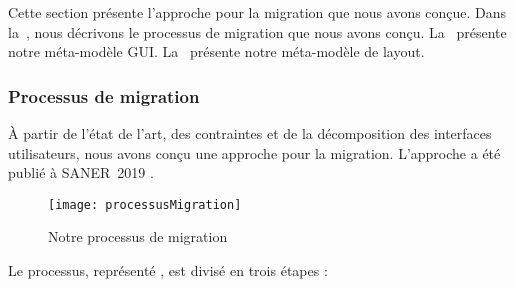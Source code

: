 \documentclass[a4paper]{article}
\begin{document}
Cette section présente l'approche pour la migration que nous avons conçue.
Dans la~, nous décrivons le processus de migration que nous avons conçu. 
La~ présente notre méta-modèle GUI.
La~ présente notre méta-modèle de layout.


\subsubsection{Processus de migration}
\label{sec:processusMigration}

À partir de l'état de l'art, des contraintes et de la décomposition des interfaces utilisateurs,
  nous avons conçu une approche pour la migration.
L'approche a été publié à SANER~2019 \citep{Verh19a}.

\begin{figure}[h]
    \begin{center}
    \texttt{[image: processusMigration]}
    \caption{Notre processus de migration}
    \label{fig:processusMigration}
    \end{center}
\end{figure}


Le processus, représenté , est divisé en trois étapes :
\end{document}
